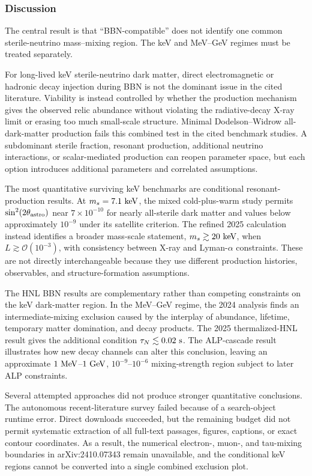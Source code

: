 \documentclass[11pt,a4paper]{article}
\begin{document}
\subsubsection*{Discussion}
The central result is that ``BBN-compatible'' does not identify one common sterile-neutrino mass--mixing region. The keV and MeV--GeV regimes must be treated separately.

For long-lived keV sterile-neutrino dark matter, direct electromagnetic or hadronic decay injection during BBN is not the dominant issue in the cited literature. Viability is instead controlled by whether the production mechanism gives the observed relic abundance without violating the radiative-decay X-ray limit or erasing too much small-scale structure. Minimal Dodelson--Widrow all-dark-matter production fails this combined test in the cited benchmark studies. A subdominant sterile fraction, resonant production, additional neutrino interactions, or scalar-mediated production can reopen parameter space, but each option introduces additional parameters and correlated assumptions.

The most quantitative surviving keV benchmarks are conditional resonant-production results. At \(m_s=7.1\ {\rm keV}\), the mixed cold-plus-warm study permits \(\sin^2(2\theta_{\rm astro})\) near \(7\times10^{-10}\) for nearly all-sterile dark matter and values below approximately \(10^{-9}\) under its satellite criterion. The refined 2025 calculation instead identifies a broader mass-scale statement, \(m_s\gtrsim20\ {\rm keV}\), when \(L\gtrsim\mathcal{O}(10^{-3})\), with consistency between X-ray and Lyman-\(\alpha\) constraints. These are not directly interchangeable because they use different production histories, observables, and structure-formation assumptions.

The HNL BBN results are complementary rather than competing constraints on the keV dark-matter region. In the MeV--GeV regime, the 2024 analysis finds an intermediate-mixing exclusion caused by the interplay of abundance, lifetime, temporary matter domination, and decay products. The 2025 thermalized-HNL result gives the additional condition \(\tau_N\lesssim0.02\ {\rm s}\). The ALP-cascade result illustrates how new decay channels can alter this conclusion, leaving an approximate \(1\ {\rm MeV}\)--\(1\ {\rm GeV}\), \(10^{-9}\)--\(10^{-6}\) mixing-strength region subject to later ALP constraints.

Several attempted approaches did not produce stronger quantitative conclusions. The autonomous recent-literature survey failed because of a search-object runtime error. Direct downloads succeeded, but the remaining budget did not permit systematic extraction of all full-text passages, figures, captions, or exact contour coordinates. As a result, the numerical electron-, muon-, and tau-mixing boundaries in arXiv:2410.07343 remain unavailable, and the conditional keV regions cannot be converted into a single combined exclusion plot.
\end{document}
